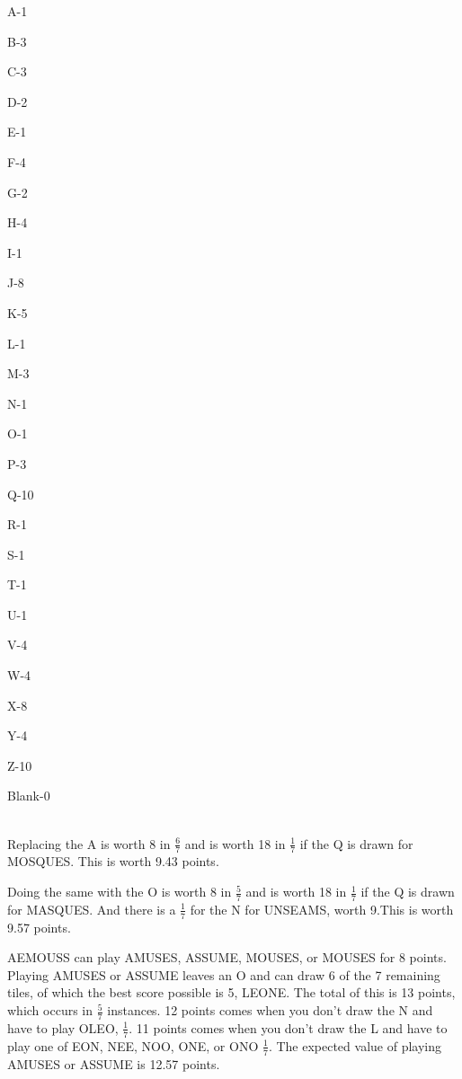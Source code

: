 \documentclass{article}
\begin{document}
\begin{center}
    A-1
    
    B-3
    
    C-3
    
    D-2
    
    E-1
    
    F-4
    
    G-2
    
    H-4
    
    I-1
    
    J-8
    
    K-5
    
    L-1
    
    M-3
    
    N-1
    
    O-1
    
    P-3
    
    Q-10
    
    R-1
    
    S-1
    
    T-1
    
    U-1
    
    V-4
    
    W-4
    
    X-8
    
    Y-4
    
    Z-10
    
    Blank-0
    
\end{center}
\\

Replacing the A is worth 8 in $\frac{6}{7}$ and is worth 18 in $\frac{1}{7}$ if the Q is drawn for MOSQUES.  This is worth 9.43 points.

Doing the same with the O is worth 8 in $\frac{5}{7}$ and is worth 18 in $\frac{1}{7}$ if the Q is drawn for MASQUES.  And there is a $\frac{1}{7}$ for the N for UNSEAMS, worth 9.This is worth 9.57 points.

AEMOUSS can play AMUSES, ASSUME, MOUSES, or MOUSES for 8 points.  Playing AMUSES or ASSUME leaves an O and can draw 6 of the 7 remaining tiles, of which the best score possible is 5, LEONE.  The total of this is 13 points, which occurs in $\frac{5}{7}$ instances.  12 points comes when you don't draw the N and have to play OLEO, $\frac{1}{7}$. 11 points comes when you don't draw the L and have to play one of EON, NEE, NOO, ONE, or ONO $\frac{1}{7}$. The expected value of playing AMUSES or ASSUME is 12.57 points. 
\end{document}
